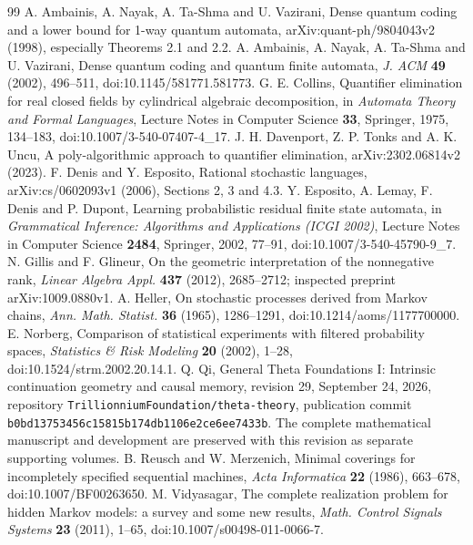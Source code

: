 \begin{thebibliography}{99}
 A. Ambainis, A. Nayak, A. Ta-Shma and U. Vazirani,
Dense quantum coding and a lower bound for 1-way quantum automata,
arXiv:quant-ph/9804043v2 (1998), especially Theorems 2.1 and 2.2.
 A. Ambainis, A. Nayak, A. Ta-Shma and U. Vazirani,
Dense quantum coding and quantum finite automata,
\emph{J. ACM} \textbf{49} (2002), 496--511,
doi:10.1145/581771.581773.
 G. E. Collins, Quantifier elimination for real closed
fields by cylindrical algebraic decomposition, in \emph{Automata Theory
and Formal Languages}, Lecture Notes in Computer Science \textbf{33},
Springer, 1975, 134--183, doi:10.1007/3-540-07407-4\_17.
 J. H. Davenport, Z. P. Tonks and A. K. Uncu,
A poly-algorithmic approach to quantifier elimination,
arXiv:2302.06814v2 (2023).
 F. Denis and Y. Esposito, Rational stochastic
languages, arXiv:cs/0602093v1 (2006), Sections 2, 3 and 4.3.
 Y. Esposito, A. Lemay, F. Denis and P. Dupont,
Learning probabilistic residual finite state automata, in
\emph{Grammatical Inference: Algorithms and Applications (ICGI 2002)},
Lecture Notes in Computer Science \textbf{2484}, Springer, 2002,
77--91, doi:10.1007/3-540-45790-9\_7.
 N. Gillis and F. Glineur, On the geometric interpretation
of the nonnegative rank, \emph{Linear Algebra Appl.} \textbf{437}
(2012), 2685--2712; inspected preprint arXiv:1009.0880v1.
 A. Heller, On stochastic processes derived from
Markov chains, \emph{Ann. Math. Statist.} \textbf{36} (1965),
1286--1291, doi:10.1214/aoms/1177700000.
 E. Norberg, Comparison of statistical experiments
with filtered probability spaces, \emph{Statistics \& Risk Modeling}
\textbf{20} (2002), 1--28, doi:10.1524/strm.2002.20.14.1.
 Q. Qi, General Theta Foundations I: Intrinsic
continuation geometry and causal memory, revision 29, September 24,
2026, repository \texttt{TrillionniumFoundation/theta-theory},
publication commit \texttt{b0bd13753456c15815b174db1106e2ce6ee7433b}.
The complete mathematical manuscript and development are preserved
with this revision as separate supporting volumes.
 B. Reusch and W. Merzenich, Minimal coverings for
incompletely specified sequential machines, \emph{Acta Informatica}
\textbf{22} (1986), 663--678, doi:10.1007/BF00263650.
 M. Vidyasagar, The complete realization problem
for hidden Markov models: a survey and some new results,
\emph{Math. Control Signals Systems} \textbf{23} (2011), 1--65,
doi:10.1007/s00498-011-0066-7.
\end{thebibliography}
